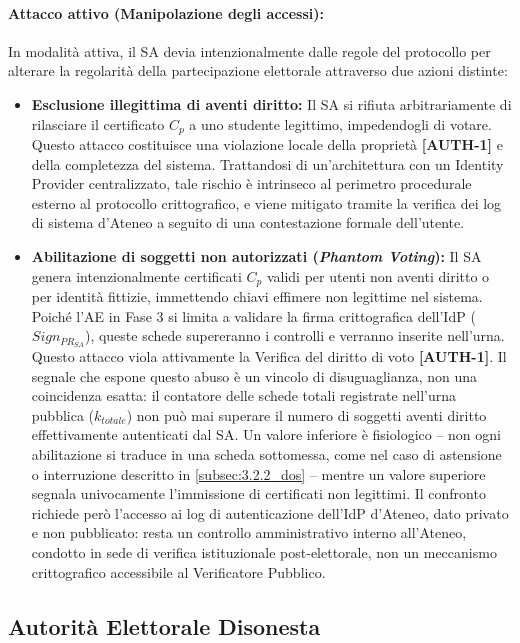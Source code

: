 \paragraph{Attacco attivo (Manipolazione degli accessi):} In modalità attiva, il SA devia intenzionalmente dalle regole del protocollo per alterare la regolarità della partecipazione elettorale attraverso due azioni distinte:
\begin{itemize}
    \item \textbf{Esclusione illegittima di aventi diritto:} Il SA si rifiuta arbitrariamente di rilasciare il certificato $C_p$ a uno studente legittimo, impedendogli di votare. Questo attacco costituisce una violazione locale della proprietà \textbf{[AUTH-1]} e della completezza del sistema. Trattandosi di un'architettura con un Identity Provider centralizzato, tale rischio è intrinseco al perimetro procedurale esterno al protocollo crittografico, e viene mitigato tramite la verifica dei log di sistema d'Ateneo a seguito di una contestazione formale dell'utente.
    \item \textbf{Abilitazione di soggetti non autorizzati (\textit{Phantom Voting}):} Il SA genera intenzionalmente certificati $C_p$ validi per utenti non aventi diritto o per identità fittizie, immettendo chiavi effimere non legittime nel sistema. Poiché l'AE in Fase 3 si limita a validare la firma crittografica dell'IdP ($Sign_{PR_{SA}}$), queste schede supereranno i controlli e verranno inserite nell'urna. Questo attacco viola attivamente la Verifica del diritto di voto \textbf{[AUTH-1]}. Il segnale che espone questo abuso è un vincolo di disuguaglianza, non una coincidenza esatta: il contatore delle schede totali registrate nell'urna pubblica ($k_{totale}$) non può mai superare il numero di soggetti aventi diritto effettivamente autenticati dal SA. Un valore inferiore è fisiologico -- non ogni abilitazione si traduce in una scheda sottomessa, come nel caso di astensione o interruzione descritto in \ref{subsec:3.2.2_dos} -- mentre un valore superiore segnala univocamente l'immissione di certificati non legittimi. Il confronto richiede però l'accesso ai log di autenticazione dell'IdP d'Ateneo, dato privato e non pubblicato: resta un controllo amministrativo interno all'Ateneo, condotto in sede di verifica istituzionale post-elettorale, non un meccanismo crittografico accessibile al Verificatore Pubblico.
\end{itemize}

\subsection{Autorità Elettorale Disonesta}
\label{subsec:3.2.7_ae_disonesta}

